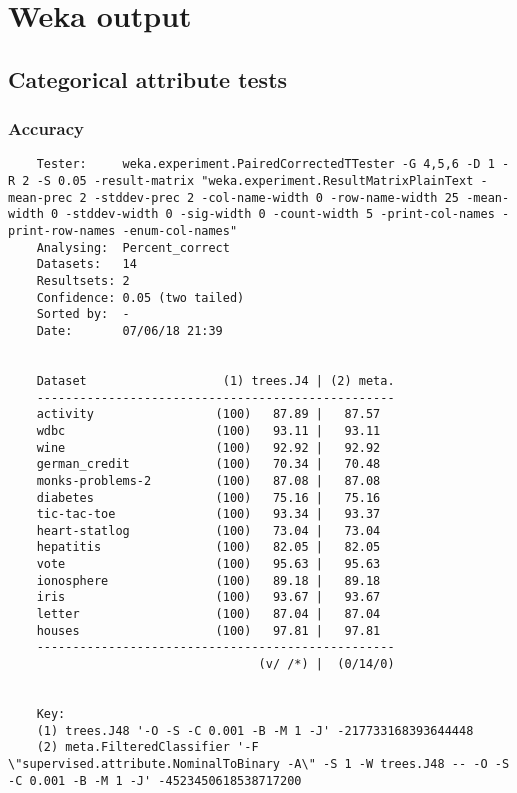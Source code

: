 \chapter{Weka output}\label{app:A}

\section{Categorical attribute tests}\label{sec:a1}
\subsection{Accuracy}
\begin{verbatim}
    Tester:     weka.experiment.PairedCorrectedTTester -G 4,5,6 -D 1 -R 2 -S 0.05 -result-matrix "weka.experiment.ResultMatrixPlainText -mean-prec 2 -stddev-prec 2 -col-name-width 0 -row-name-width 25 -mean-width 0 -stddev-width 0 -sig-width 0 -count-width 5 -print-col-names -print-row-names -enum-col-names"
    Analysing:  Percent_correct
    Datasets:   14
    Resultsets: 2
    Confidence: 0.05 (two tailed)
    Sorted by:  -
    Date:       07/06/18 21:39
    
    
    Dataset                   (1) trees.J4 | (2) meta.
    --------------------------------------------------
    activity                 (100)   87.89 |   87.57  
    wdbc                     (100)   93.11 |   93.11  
    wine                     (100)   92.92 |   92.92  
    german_credit            (100)   70.34 |   70.48  
    monks-problems-2         (100)   87.08 |   87.08  
    diabetes                 (100)   75.16 |   75.16  
    tic-tac-toe              (100)   93.34 |   93.37  
    heart-statlog            (100)   73.04 |   73.04  
    hepatitis                (100)   82.05 |   82.05  
    vote                     (100)   95.63 |   95.63  
    ionosphere               (100)   89.18 |   89.18  
    iris                     (100)   93.67 |   93.67  
    letter                   (100)   87.04 |   87.04  
    houses                   (100)   97.81 |   97.81  
    --------------------------------------------------
                                   (v/ /*) |  (0/14/0)
    
    
    Key:
    (1) trees.J48 '-O -S -C 0.001 -B -M 1 -J' -217733168393644448
    (2) meta.FilteredClassifier '-F \"supervised.attribute.NominalToBinary -A\" -S 1 -W trees.J48 -- -O -S -C 0.001 -B -M 1 -J' -4523450618538717200    
\end{verbatim}

